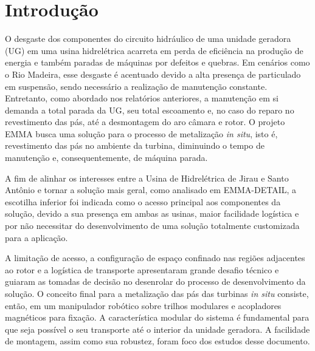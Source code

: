 \section{Introdução}

O desgaste dos componentes do circuito hidráulico de uma unidade geradora (UG)
em uma usina hidrelétrica acarreta em perda de eficiência na produção de energia e
também paradas de máquinas por defeitos e quebras. Em cenários como o Rio
Madeira, esse desgaste é acentuado devido a alta presença de particulado em
suspensão, sendo necessário a realização de manutenção constante. Entretanto,
como abordado nos relatórios anteriores, a manutenção em si demanda a total
parada da UG, seu total escoamento e, no caso do reparo no revestimento das
pás, até a desmontagem do aro câmara e rotor. O projeto EMMA busca uma solução
para o processo de metalização \textit{in situ}, isto é, revestimento das pás no
ambiente da turbina, diminuindo o tempo de manutenção e, consequentemente, de
máquina parada.

A fim de alinhar os interesses entre a Usina de Hidrelétrica de Jirau e Santo
Antônio e tornar a solução mais geral, como analisado em EMMA-DETAIL, a
escotilha inferior foi indicada como o acesso principal aos componentes da
solução, devido a sua presença em
ambas as usinas, maior facilidade logística e por não necessitar do
desenvolvimento de uma solução totalmente customizada para a aplicação. 

A limitação de acesso, a configuração de espaço confinado nas regiões adjacentes
ao rotor e a logística de transporte apresentaram grande desafio técnico e
guiaram as tomadas de decisão no desenrolar do processo de desenvolvimento da
solução. O conceito final para a metalização das pás das turbinas \textit{in
situ} consiste, então, em um manipulador robótico sobre trilhos modulares e
acopladores magnéticos para fixação. A característica modular do sistema é
fundamental para que seja possível o seu transporte até o interior da unidade
geradora. A facilidade de montagem, assim como sua robustez, foram foco dos
estudos desse documento. 

